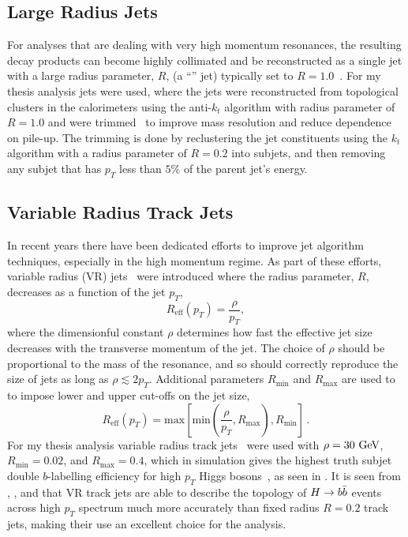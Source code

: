 \subsection{Large Radius Jets}\label{subsection:largeR_jets}

For analyses that are dealing with very high momentum resonances, the resulting decay products can become highly collimated and be reconstructed as a single jet with a large radius parameter, $R$, (a ``\largeR{}'' jet) typically set to $R=1.0$~\cite{JETM-2018-02,SUSY-2016-13}.
For my thesis analysis \largeR{} jets were used, where the \largeR{} jets were reconstructed from topological clusters in the calorimeters using the anti-$k_{t}$ algorithm with radius parameter of $R=1.0$ and were trimmed~\cite{Krohn:2009th} to improve mass resolution and reduce dependence on pile-up.
The trimming is done by reclustering the \largeR{} jet constituents using the $k_{t}$ algorithm with a radius parameter of $R=0.2$ into subjets, and then removing any subjet that has $p_{T}$ less than $5\%$ of the \largeR{} parent jet's energy.

\subsection{Variable Radius Track Jets}\label{subsection:VR_jets}

In recent years there have been dedicated efforts to improve jet algorithm techniques, especially in the high momentum regime.
As part of these efforts, variable radius (VR) jets~\cite{Krohn:2009zg,ATL-PHYS-PUB-2017-010} were introduced where the radius parameter, $R$, decreases as a function of the jet $p_{T}$,
\[
 R_{\mathrm{eff}} \left(p_{T}\right)= \frac{\rho}{p_{T}},
\]
where the dimensionful constant $\rho$ determines how fast the effective jet size decreases with the transverse momentum of the jet.
The choice of $\rho$ should be proportional to the mass of the resonance, and so should correctly reproduce the size of jets as long as $\rho \lesssim 2 p_{T}$.
Additional parameters $R_{\mathrm{min}}$ and $R_{\mathrm{max}}$ are used to to impose
lower and upper cut-offs on the jet size,
\[
 R_{\mathrm{eff}} \left(p_{T}\right)= \mathrm{max}\left[\mathrm{min}\left(\frac{\rho}{p_{T}},R_{\mathrm{max}}\right),R_{\mathrm{min}}\right]\,.
\]
For my thesis analysis variable radius track jets~\cite{Zenz:2010hfa} were used with $\rho=30~\mathrm{GeV}$, $R_{\mathrm{min}}=0.02$, and $R_{\mathrm{max}}=0.4$, which in simulation gives the highest truth subjet double $b$-labelling efficiency for high $p_{T}$ Higgs bosons~\cite{ATL-PHYS-PUB-2017-010}, as seen in .
It is seen from , , and  that VR track jets are able to describe the topology of $H \to b\bar{b}$ events across high $p_{T}$ spectrum much more accurately than fixed radius $R=0.2$ track jets, making their use an excellent choice for the analysis.

